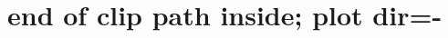 \documentclass[a4paper]{article}
\begin{document}
	\section{end of clip path inside; plot dir=-}
	\def\clippath{%
		\pgfsyssoftpath@movetotoken {10.0pt}{40.0pt}%
		\pgfsyssoftpath@linetotoken {10.0pt}{-40pt}%
		\pgfsyssoftpath@linetotoken {130.0pt}{-40pt}%
		\pgfsyssoftpath@linetotoken {130.0pt}{40pt}%
		\pgfsyssoftpath@linetotoken {10.0pt}{40pt}%
	}%
	\def\expected{%
		\pgfsyssoftpath@movetotoken {130.0119pt}{16.18913pt}\pgfsyssoftpath@linetotoken {113.81097pt}{0.0pt}\pgfsyssoftpath@linetotoken {85.35823pt}{28.45274pt}\pgfsyssoftpath@linetotoken {56.90549pt}{0.0pt}%
	}
	\TESTCASE
\end{document}
